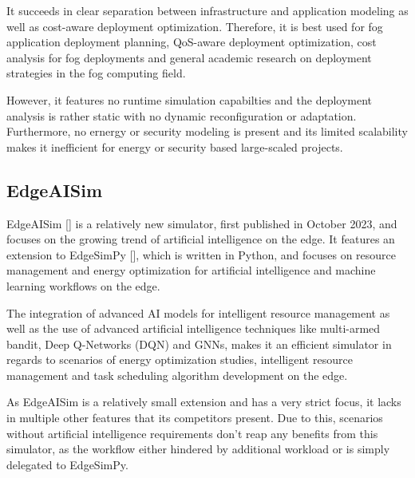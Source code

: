It succeeds in clear separation between infrastructure and application modeling as well as cost-aware deployment optimization.
Therefore, it is best used for fog application deployment planning, QoS-aware deployment optimization, cost analysis for fog deployments and general academic research on deployment strategies in the fog computing field.

However, it features no runtime simulation capabilties and the deployment analysis is rather static with no dynamic reconfiguration or adaptation.
Furthermore, no ernergy or security modeling is present and its limited scalability makes it inefficient for energy or security based large-scaled projects.

\subsection{EdgeAISim}\label{sec:EdgeAISim}
EdgeAISim [\cite{sim-edgeAIsim}] is a relatively new simulator, first published in October 2023, and focuses on the growing trend of artificial intelligence on the edge.
It features an extension to EdgeSimPy [\cite{sim-base-edgeSimpy}], which is written in Python, and focuses on resource management and energy optimization for artificial intelligence and machine learning workflows on the edge.

The integration of advanced AI models for intelligent resource management as well as the use of advanced artificial intelligence techniques like multi-armed bandit, Deep Q-Networks (DQN) and GNNs, makes it an 
efficient simulator in regards to scenarios of energy optimization studies, intelligent resource management and task scheduling algorithm development on the edge.

As EdgeAISim is a relatively small extension and has a very strict focus, it lacks in multiple other features that its competitors present.
Due to this, scenarios without artificial intelligence requirements don't reap any benefits from this simulator, as the workflow either hindered by additional workload or is simply 
delegated to EdgeSimPy.

